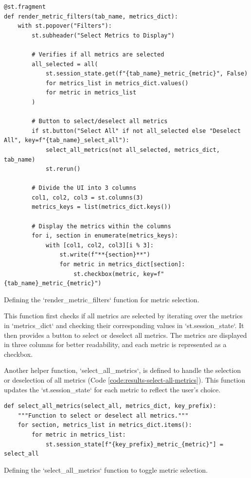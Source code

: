 \begin{longlisting}
\begin{verbatim}
@st.fragment
def render_metric_filters(tab_name, metrics_dict):
    with st.popover("Filters"):
        st.subheader("Select Metrics to Display")

        # Verifies if all metrics are selected
        all_selected = all(
            st.session_state.get(f"{tab_name}_metric_{metric}", False)
            for metrics_list in metrics_dict.values()
            for metric in metrics_list
        )

        # Button to select/deselect all metrics
        if st.button("Select All" if not all_selected else "Deselect All", key=f"{tab_name}_select_all"):
            select_all_metrics(not all_selected, metrics_dict, tab_name)
            st.rerun()

        # Divide the UI into 3 columns
        col1, col2, col3 = st.columns(3)
        metrics_keys = list(metrics_dict.keys())

        # Display the metrics within the columns
        for i, section in enumerate(metrics_keys):
            with [col1, col2, col3][i % 3]:
                st.write(f"**{section}**")
                for metric in metrics_dict[section]:
                    st.checkbox(metric, key=f"{tab_name}_metric_{metric}")
\end{verbatim}
\caption{Defining the `render\_metric\_filters` function for metric selection.}
\label{code:results-render-metric-filters}
\end{longlisting}

This function first checks if all metrics are selected by iterating over the metrics in `metrics\_dict` and checking their corresponding values in `st.session\_state`. It then provides a button to select or deselect all metrics. The metrics are displayed in three columns for better readability, and each metric is represented as a checkbox.

Another helper function, `select\_all\_metrics`, is defined to handle the selection or deselection of all metrics (Code \ref{code:results-select-all-metrics}). This function updates the `st.session\_state` for each metric to reflect the user's choice.

\begin{longlisting}
\begin{verbatim}
def select_all_metrics(select_all, metrics_dict, key_prefix):
    """Function to select or deselect all metrics."""
    for section, metrics_list in metrics_dict.items():
        for metric in metrics_list:
            st.session_state[f"{key_prefix}_metric_{metric}"] = select_all
\end{verbatim}
\caption{Defining the `select\_all\_metrics` function to toggle metric selection.}
\label{code:results-select-all-metrics}
\end{longlisting}

